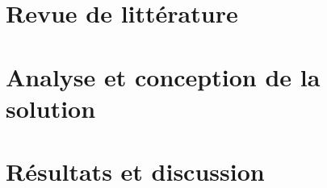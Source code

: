 \documentclass{ifri}
\begin{document}
\pageDeGarde

\pagecolor{white}





\setcounter{tocdepth}{0}
\setcounter{tocdepth}{5}


\newpage


\newpage


\newpage


\listoffigures
\newpage

\listoftables




\glsaddall

\printglossary[type=\acronymtype,title={Liste des acronymes}]
\printglossary[title={Glossaire}]

\newpage


\setcounter{page}{1}

\fancyhead[L]{}
\fancyhead[R]{}
\fancyhead[C]{}
\fancyfoot[C]{\thepage}



\fancyhead[L]{\tiny \leftmark}
\fancyhead[R]{\scriptsize \rightmark}
\fancyfoot[C]{\thepage}


\chapter{Revue de littérature}
\label{chap:revue-litterature}


\chapter{Analyse et conception de la solution}
\label{chap:conception-ransomshield}


\chapter{Résultats et discussion}
\label{chap:implementation-tests}


% 

%
\lhead[]{} \rhead[]{} \chead[]{}






%

\newpage
\tableofcontents
\end{document}

